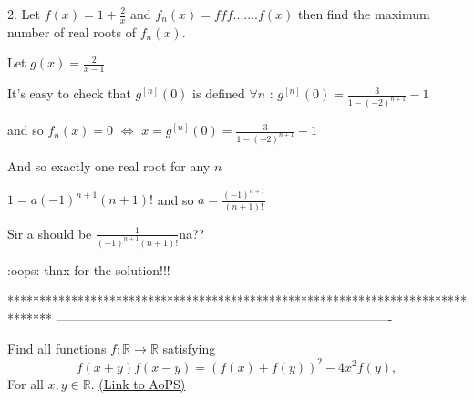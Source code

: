 \begin{solution}
	\begin{tcolorbox} 2. Let $f(x)=1+\frac{2}{x}$ and $f_{n}(x)=fff.......f(x)$ then find the maximum number of real roots of $f_{n}(x)$.\end{tcolorbox}
Let $g(x)=\frac 2{x-1}$

It's easy to check that $g^{[n]}(0)$ is defined $\forall n$  : $g^{[n]}(0)=\frac 3{1-(-2)^{n+1}}-1$

and so $f_n(x)=0$ $\iff$ $x=g^{[n]}(0)=\frac 3{1-(-2)^{n+1}}-1$

And so exactly one real root for any $n$
\end{solution}



\begin{solution}
	\begin{tcolorbox}$1=a(-1)^{n+1}(n+1)!$ and so $a=\frac{(-1)^{n+1}}{(n+1)!}$\end{tcolorbox}

Sir a should be $\frac{1}{(-1)^{n+1}(n+1)!}$na??
\end{solution}






\begin{solution}
	:oops: 
thnx for the solution!!!
\end{solution}
*******************************************************************************
-------------------------------------------------------------------------------

\begin{problem}
	Find all functions $f:\mathbb{R}\to \mathbb R$ satisfying
\[f(x+y)f(x-y)=\left(f(x)+f(y)\right)^2-4x^2f(y),\]
For all $x,y\in\mathbb R$.
	\flushright \href{https://artofproblemsolving.com/community/c6h390192}{(Link to AoPS)}
\end{problem}



